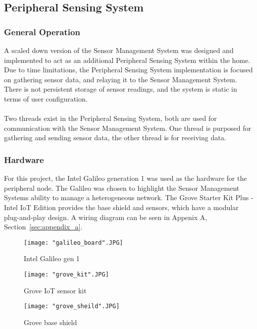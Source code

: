 \documentclass{article}
\begin{document}
\newpage
\subsection{Peripheral Sensing System}
\subsubsection{General Operation}
A scaled down version of the Sensor Management System was designed and implemented to act as an additional Peripheral Sensing System within the home. Due to time limitations, the Peripheral Sensing System implementation is focused on gathering sensor data, and relaying it to the Sensor Management System. There is not persistent storage of sensor readings, and the system is static in terms of user configuration. \\\\
Two threads exist in the Peripheral Sensing System, both are used for communication with the Sensor Management System. One thread is purposed for gathering and sending sensor data, the other thread is for receiving data. 

\subsubsection{Hardware}
For this project, the Intel Galileo generation 1 was used as the hardware for the peripheral node. The Galileo was chosen to highlight the Sensor Management Systems ability to manage a heterogeneous network. The Grove Starter Kit Plus - Intel IoT Edition provides the base shield and sensors, which have a modular plug-and-play design. A wiring diagram can be seen in Appenix A, Section~\ref{sec:appendix_a}.

\begin{figure}[H]
\centering
\texttt{[image: "galileo\_board".JPG]}
\caption{Intel Galileo gen 1}
\label{fig:hard_galileo}
\end{figure}

\begin{figure}[H]
\centering
\texttt{[image: "grove\_kit".JPG]}
\caption{Grove IoT sensor kit}
\label{fig:hard_grove_kit}
\end{figure}

\begin{figure}[H]
\centering
\texttt{[image: "grove\_sheild".JPG]}
\caption{Grove base shield}
\label{fig:hard_grove_sheild}
\end{figure}
\end{document}

